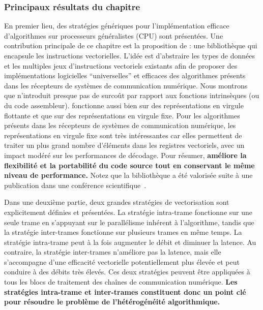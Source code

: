 \subsubsection*{Principaux résultats du chapitre}

En premier lieu, des stratégies génériques pour l'implémentation efficace
d'algorithmes sur processeurs généralistes (CPU) sont présentées. Une
contribution principale de ce chapitre est la proposition de \MIPP : une
bibliothèque qui encapsule les instructions vectorielles. L'idée est d'abstraire
les types de données et les multiples jeux d’instructions vectoriels existants
afin de proposer des implémentations logicielles ``universelles'' et efficaces
des algorithmes présents dans les récepteurs de systèmes de communication
numérique. Nous montrons que \MIPP n'introduit presque pas de surcoût par
rapport aux fonctions intrinsèques (ou du code assembleur). \MIPP fonctionne
aussi bien sur des représentations en virgule flottante et que sur des
représentations en virgule fixe. Pour les algorithmes présents dans les
récepteurs de systèmes de communication numérique, les représentations en
virgule fixe sont très intéressantes car elles permettent de traiter un plus
grand nombre d'éléments dans les registres vectoriels, avec un impact modéré sur
les performances de décodage. Pour résumer, \textbf{\MIPP améliore la
flexibilité et la portabilité du code source tout en conservant le même niveau
de performance.} Notez que la bibliothèque \MIPP a été valorisée suite à une
publication dans une conférence scientifique~\cite{Cassagne2018}.

Dans une deuxième partie, deux grandes stratégies de vectorisation sont
explicitement définies et présentées. La stratégie intra-trame fonctionne
sur une seule trame en s'appuyant sur le parallélisme inhérent à l'algorithme,
tandis que la stratégie inter-trames fonctionne sur plusieurs trames en
même temps. La stratégie intra-trame peut à la fois augmenter le débit et
diminuer la latence. Au contraire, la stratégie inter-trames n'améliore pas la
latence, mais elle s'accompagne d'une efficacité vectorielle potentiellement
plus élevée et peut conduire à des débits très élevés. Ces deux stratégies
peuvent être appliquées à tous les blocs de traitement des chaînes de
communication numérique. \textbf{Les stratégies intra-trame et inter-trames
constituent donc un point clé pour résoudre le problème de l'hétérogénéité
algorithmique.}

